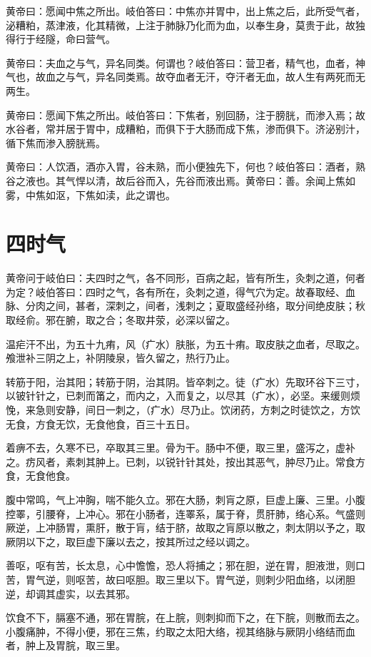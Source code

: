 \documentclass[a4paper,12pt,UTF8,twoside]{ctexbook}
\begin{document}
	黄帝曰：愿闻中焦之所出。岐伯答曰：中焦亦并胃中，出上焦之后，此所受气者，泌糟粕，蒸津液，化其精微，上注于肺脉乃化而为血，以奉生身，莫贵于此，故独得行于经隧，命曰营气。
	
	黄帝曰：夫血之与气，异名同类。何谓也？岐伯答曰：营卫者，精气也，血者，神气也，故血之与气，异名同类焉。故夺血者无汗，夺汗者无血，故人生有两死而无两生。
	
	黄帝曰：愿闻下焦之所出。岐伯答曰：下焦者，别回肠，注于膀胱，而渗入焉；故水谷者，常并居于胃中，成糟粕，而俱下于大肠而成下焦，渗而俱下。济泌别汁，循下焦而渗入膀胱焉。
	
	黄帝曰：人饮酒，酒亦入胃，谷未熟，而小便独先下，何也？岐伯答曰：酒者，熟谷之液也。其气悍以清，故后谷而入，先谷而液出焉。黄帝曰：善。余闻上焦如雾，中焦如沤，下焦如渎，此之谓也。
	\chapter{四时气}
	
	黄帝问于岐伯曰：夫四时之气，各不同形，百病之起，皆有所生，灸刺之道，何者为定？岐伯答曰：四时之气，各有所在，灸刺之道，得气穴为定。故春取经、血脉、分肉之间，甚者，深刺之，间者，浅刺之；夏取盛经孙络，取分间绝皮肤；秋取经俞。邪在腑，取之合；冬取井荥，必深以留之。
	
	温疟汗不出，为五十九痏，风（疒水）肤胀，为五十痏。取皮肤之血者，尽取之。飧泄补三阴之上，补阴陵泉，皆久留之，热行乃止。
	
	转筋于阳，治其阳；转筋于阴，治其阴。皆卒刺之。徒（疒水）先取环谷下三寸，以铍针针之，已刺而筩之，而内之，入而复之，以尽其（疒水），必坚。来缓则烦悗，来急则安静，间日一刺之，（疒水）尽乃止。饮闭药，方刺之时徒饮之，方饮无食，方食无饮，无食他食，百三十五日。
	
	着痹不去，久寒不已，卒取其三里。骨为干。肠中不便，取三里，盛泻之，虚补之。疠风者，素刺其肿上。已刺，以锐针针其处，按出其恶气，肿尽乃止。常食方食，无食他食。
	
	腹中常鸣，气上冲胸，喘不能久立。邪在大肠，刺肓之原，巨虚上廉、三里。小腹控睪，引腰脊，上冲心。邪在小肠者，连睪系，属于脊，贯肝肺，络心系。气盛则厥逆，上冲肠胃，熏肝，散于肓，结于脐，故取之肓原以散之，刺太阴以予之，取厥阴以下之，取巨虚下廉以去之，按其所过之经以调之。
	
	善呕，呕有苦，长太息，心中憺憺，恐人将捕之；邪在胆，逆在胃，胆液泄，则口苦，胃气逆，则呕苦，故曰呕胆。取三里以下。胃气逆，则刺少阳血络，以闭胆逆，却调其虚实，以去其邪。
	
	饮食不下，膈塞不通，邪在胃脘，在上脘，则刺抑而下之，在下脘，则散而去之。小腹痛肿，不得小便，邪在三焦，约取之太阳大络，视其络脉与厥阴小络结而血者，肿上及胃脘，取三里。
	
\end{document}
